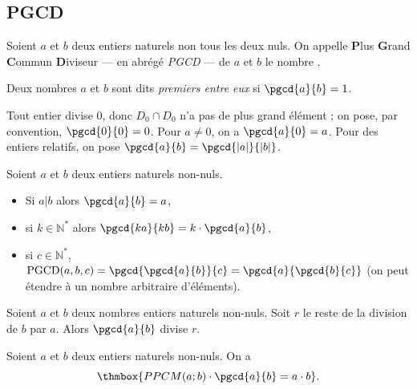       \subsection{PGCD}
      \begin{defi}
      Soient $a$ et $b$ deux entiers naturels non tous les deux nuls.
      On appelle \textbf{P}lus \textbf{G}rand \textbf{C}ommun \textbf{D}iviseur
      --- en abr\'eg\'e \emph{PGCD} --- de $a$ et $b$ le nombre 
            .
      
      
      Deux nombres $a$ et $b$ sont dits \emph{premiers entre eux} si $\pgcd{a}{b} = 1$.
      \end{defi}
      \begin{rmk}
            Tout entier divise $0$, donc $D_0 \cap D_0$ n'a pas de plus grand \'el\'ement ;
            on pose, par convention, $\pgcd{0}{0}=0$.
            Pour $a \neq 0$, on a $\pgcd{a}{0} = a$.
            Pour des entiers relatifs, on pose $\pgcd{a}{b} = \pgcd{|a|}{|b|}$.
      \end{rmk}
      \begin{prop}
            Soient $a$ et $b$ deux entiers naturels non-nuls.
            \begin{itemize}
                  \item Si $a|b$ alors $\pgcd{a}{b} = a$,
                  \item si $k\in\mathbb{N}^*$ alors $\pgcd{ka}{kb} = k \cdot \pgcd{a}{b}$,
                  \item si $c\in\mathbb{N}^*$, $\mathrm{PGCD}(a,b,c) = \pgcd{\pgcd{a}{b}}{c} = \pgcd{a}{\pgcd{b}{c}}$
                        (on peut \'etendre \`a un nombre arbitraire d'\'el\'ements).
            \end{itemize}
      \end{prop}
      \begin{thm}
            Soient $a$ et $b$ deux nombres entiers naturels non-nuls.
            Soit $r$ le reste de la division de $b$ par $a$.
            Alors $\pgcd{a}{b}$ divise $r$.
            
      \end{thm}
      \begin{thm}
            Soient $a$ et $b$ deux entiers naturels non-nuls.
            On a
            \[
                  \thmbox{PPCM(a;b)\cdot \pgcd{a}{b}=a\cdot b}.
            \]
      \end{thm}
